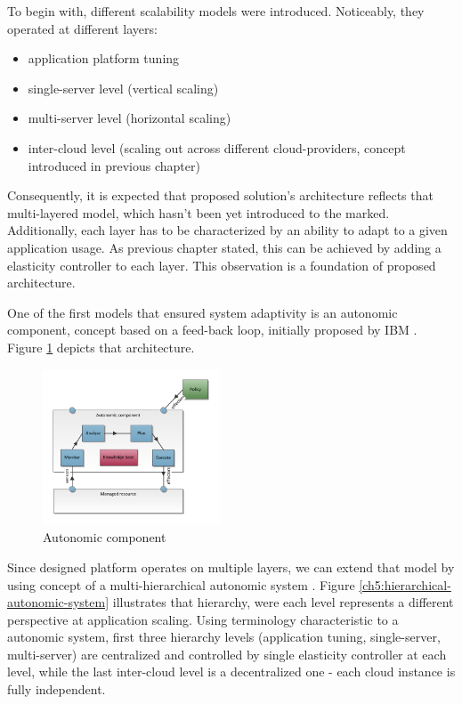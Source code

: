 \documentclass[twocolumn]{svjour3}          %
\begin{document}
To begin with, different scalability models were introduced. Noticeably, they operated at different layers: 
\begin{itemize}
	\item application platform tuning
	\item single-server level (vertical scaling)
	\item multi-server level (horizontal scaling) 
	\item inter-cloud level (scaling out across different cloud-providers, concept introduced in previous chapter)
\end{itemize}
Consequently, it is expected that proposed solution's architecture reflects that multi-layered model, which hasn't been yet introduced to the marked. Additionally, each layer has to be characterized by an ability to adapt to a given application usage. As previous chapter stated, this can be achieved by adding a elasticity controller to each layer. This observation is a foundation of proposed architecture.

One of the first models that ensured system adaptivity is an autonomic component, concept based on a feed-back loop, initially proposed by IBM \cite{IBM06}. Figure \ref{ch5:autonomic-component} depicts that architecture. 

\begin{figure}[!ht]
  \includegraphics[width=0.47\textwidth]{drawings/autonomic-component}
  \caption{Autonomic component}
  \label{ch5:autonomic-component}
\end{figure}

Since designed platform operates on multiple layers, we can extend that model by using concept of a multi-hierarchical autonomic system \cite{LiWoZh05}. Figure \ref{ch5:hierarchical-autonomic-system} illustrates that hierarchy, were each level represents a different perspective at application scaling. Using terminology characteristic to a autonomic system, first three hierarchy levels (application tuning, single-server, multi-server) are centralized and controlled by single elasticity controller at each level, while the last inter-cloud level is a decentralized one - each cloud instance is fully independent.
\end{document}
